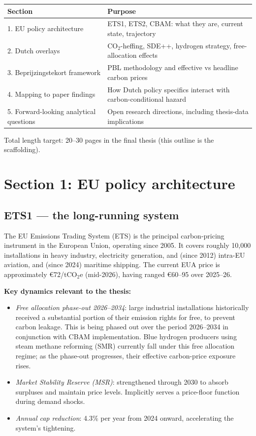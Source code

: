 \documentclass[11pt,a4paper]{article}
\begin{document}
\begin{table}[h]
\centering
\begin{tabular}{lp{10cm}}
\toprule
\textbf{Section} & \textbf{Purpose} \\
\midrule
1. EU policy architecture & ETS1, ETS2, CBAM: what they are, current state, trajectory \\
2. Dutch overlays & CO$_2$-heffing, SDE++, hydrogen strategy, free-allocation effects \\
3. Beprijzingstekort framework & PBL methodology and effective vs headline carbon prices \\
4. Mapping to paper findings & How Dutch policy specifics interact with carbon-conditional hazard \\
5. Forward-looking analytical questions & Open research directions, including thesis-data implications \\
\bottomrule
\end{tabular}
\end{table}

Total length target: 20--30 pages in the final thesis (this outline is the scaffolding).

\newpage

\section{Section 1: EU policy architecture}

\subsection{ETS1 --- the long-running system}

The EU Emissions Trading System (ETS) is the principal carbon-pricing instrument in the European Union, operating since 2005. It covers roughly 10,000 installations in heavy industry, electricity generation, and (since 2012) intra-EU aviation, and (since 2024) maritime shipping. The current EUA price is approximately \euro 72/tCO$_2$e (mid-2026), having ranged \euro 60--95 over 2025--26.

\textbf{Key dynamics relevant to the thesis:}
\begin{itemize}
  \item \emph{Free allocation phase-out 2026--2034}: large industrial installations historically received a substantial portion of their emission rights for free, to prevent carbon leakage. This is being phased out over the period 2026--2034 in conjunction with CBAM implementation. Blue hydrogen producers using steam methane reforming (SMR) currently fall under this free allocation regime; as the phase-out progresses, their effective carbon-price exposure rises.
  \item \emph{Market Stability Reserve (MSR)}: strengthened through 2030 to absorb surpluses and maintain price levels. Implicitly serves a price-floor function during demand shocks.
  \item \emph{Annual cap reduction}: 4.3\% per year from 2024 onward, accelerating the system's tightening.
\end{itemize}
\end{document}
